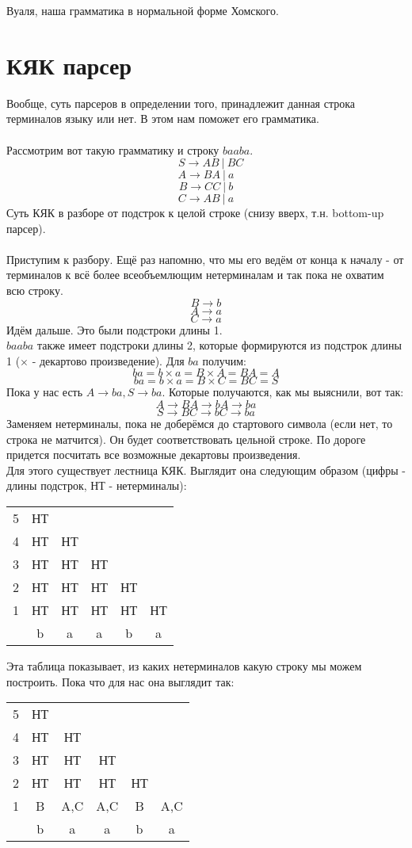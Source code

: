 \documentclass{article}
\begin{document}
Вуаля, наша грамматика в нормальной форме Хомского.

\part{КЯК парсер}
Вообще, суть парсеров в определении того, принадлежит 
данная строка терминалов языку или нет. В этом нам поможет его грамматика.
\\\\
Рассмотрим вот такую грамматику и строку $baaba$.
$$\ \ \ \ S \to AB \ | \ BC $$
$$A \to BA \ | \ a $$
$$B \to CC \ | \ b $$
$$C \to AB \ | \ a $$
Суть КЯК в разборе от подстрок к целой строке (снизу вверх,
т.н. bottom-up парсер). 
\\\\
Приступим к разбору. Ещё раз напомню, что мы его ведём от конца к началу - 
от терминалов к всё более всеобъемлющим нетерминалам и так пока не охватим всю строку.
$$B \to b$$
$$A \to a$$
$$C \to a$$
Идём дальше. Это были подстроки длины 1. \\
$baaba$ также имеет подстроки длины 2,
которые формируются из подстрок длины 1 ($\times$ - декартово произведение).
Для $ba$ получим:
$$ba = b\times a = B \times A = BA = A$$
$$ba = b\times a = B \times C = BC = S$$
Пока у нас есть $A \to ba, S \to ba$. 
Которые получаются, как мы выяснили, вот так:
$$ A \to BA \to bA \to ba$$
$$ S \to BC \to bC \to ba$$
Заменяем нетерминалы, пока не доберёмся до стартового символа (если нет, то строка не матчится).
Он будет соответствовать цельной строке. По дороге придется посчитать
все возможные декартовы произведения.\\
Для этого существует лестница КЯК. 
Выглядит она следующим образом (цифры - длины подстрок, НТ - нетерминалы):\\
\begin{center}
    \begin{tabular}{ c|c c c c c }
    5 & НТ \\ 
    4 & НТ & НТ  \\  
    3 & НТ & НТ & НТ   \\  
    2 & НТ & НТ & НТ & НТ  \\  
    1 & НТ & НТ & НТ & НТ & НТ  \\
    \hline
      & b  &  a &  a & b  &  a 
    \end{tabular}
\end{center}
Эта таблица показывает, из каких нетерминалов какую строку мы можем построить.
Пока что для нас она выглядит так:
\begin{center}
    \begin{tabular}{ c|c c c c c }
    5 & НТ  \\ 
    4 & НТ & НТ   \\  
    3 & НТ & НТ & НТ   \\  
    2 & НТ & НТ & НТ & НТ  \\  
    1 & B & A,C & A,C & B & A,C  \\
    \hline
      & b  &  a &  a & b  &  a 
    \end{tabular}
\end{center}
\end{document}

